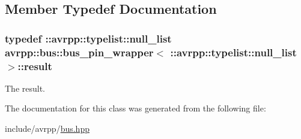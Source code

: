 \subsection{Member Typedef Documentation}
\hypertarget{classavrpp_1_1bus_1_1bus__pin__wrapper_3_01_1_1avrpp_1_1typelist_1_1null__list_01_4_a9bcdb8ea663de17068e26e9eeb9419b8}{
\subsubsection[{result}]{\setlength{\rightskip}{0pt plus 5cm}typedef ::{\bf avrpp::typelist::null\_\-list} avrpp::bus::bus\_\-pin\_\-wrapper$<$ ::{\bf avrpp::typelist::null\_\-list} $>$::{\bf result}}}
\label{classavrpp_1_1bus_1_1bus__pin__wrapper_3_01_1_1avrpp_1_1typelist_1_1null__list_01_4_a9bcdb8ea663de17068e26e9eeb9419b8}


The result. 



The documentation for this class was generated from the following file:\begin{DoxyCompactItemize}
\item 
include/avrpp/\hyperlink{bus_8hpp}{bus.hpp}\end{DoxyCompactItemize}
